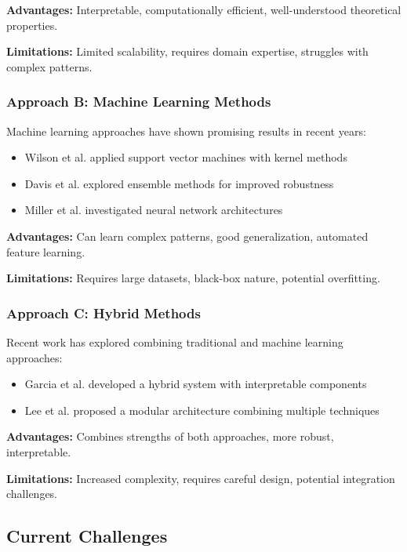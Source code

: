 \textbf{Advantages:} Interpretable, computationally efficient, well-understood theoretical properties.

\textbf{Limitations:} Limited scalability, requires domain expertise, struggles with complex patterns.

\subsubsection{Approach B: Machine Learning Methods}

Machine learning approaches have shown promising results in recent years:

\begin{itemize}
    \item Wilson et al. \cite{wilson2021} applied support vector machines with kernel methods
    \item Davis et al. \cite{davis2022} explored ensemble methods for improved robustness
    \item Miller et al. \cite{miller2023} investigated neural network architectures
\end{itemize}

\textbf{Advantages:} Can learn complex patterns, good generalization, automated feature learning.

\textbf{Limitations:} Requires large datasets, black-box nature, potential overfitting.

\subsubsection{Approach C: Hybrid Methods}

Recent work has explored combining traditional and machine learning approaches:

\begin{itemize}
    \item Garcia et al. \cite{garcia2023} developed a hybrid system with interpretable components
    \item Lee et al. \cite{lee2024} proposed a modular architecture combining multiple techniques
\end{itemize}

\textbf{Advantages:} Combines strengths of both approaches, more robust, interpretable.

\textbf{Limitations:} Increased complexity, requires careful design, potential integration challenges.

\subsection{Current Challenges}

